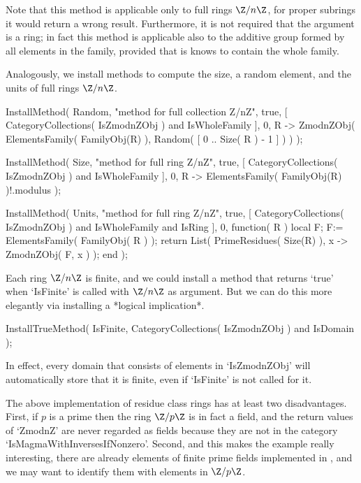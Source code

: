 Note that this method is applicable only to full rings $\Z/n\Z$,
for proper subrings it would return a wrong result.
Furthermore, it is not required that the argument is a ring;
in fact this method is applicable also to the additive group
formed by all elements in the family,
provided that is knows to contain the whole family.

Analogously, we install methods to compute the size,
a random element, and the units of full rings $\Z/n\Z$.

\begintt
    InstallMethod( Random,
        "method for full collection Z/nZ",
        true,
        [ CategoryCollections( IsZmodnZObj ) and IsWholeFamily ], 0,
        R -> ZmodnZObj( ElementsFamily( FamilyObj(R) ),
                        Random( [ 0 .. Size( R ) - 1 ] ) ) );

    InstallMethod( Size,
        "method for full ring Z/nZ",
        true,
        [ CategoryCollections( IsZmodnZObj ) and IsWholeFamily ], 0,
        R -> ElementsFamily( FamilyObj(R) )!.modulus );

    InstallMethod( Units,
        "method for full ring Z/nZ",
        true,
        [     CategoryCollections( IsZmodnZObj )
          and IsWholeFamily and IsRing ], 0,
        function( R )
        local F;
        F:= ElementsFamily( FamilyObj( R ) );
        return List( PrimeResidues( Size(R) ), x -> ZmodnZObj( F, x ) );
        end );
\endtt

Each ring $\Z/n\Z$ is finite,
and we could install a method that returns `true' when `IsFinite' is
called with $\Z/n\Z$ as argument.
But we can do this more elegantly via installing a *logical implication*.

\begintt
    InstallTrueMethod( IsFinite,
        CategoryCollections( IsZmodnZObj ) and IsDomain );
\endtt

In effect, every domain that consists of elements in `IsZmodnZObj'
will automatically store that it is finite,
even if `IsFinite' is not called for it.



The above implementation of residue class rings has at least two
disadvantages.
First, if $p$ is a prime then the ring $\Z/p\Z$ is in fact a field,
and the return values of `ZmodnZ' are never regarded as fields because
they are not in the category `IsMagmaWithInversesIfNonzero'.
Second, and this makes the example really interesting,
there are already elements of finite prime fields implemented in {\GAP},
and we may want to identify them with elements in $\Z/p\Z$.


